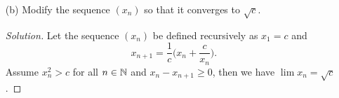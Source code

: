 \begin{enumerate}
\begin{proof}
\begin{align*}
                        &= 0. 
        \end{align*}
        Furthermore, when \( x^2 = 2 \) we get that \( x_n - x_{n+1} = 0 \). Hence, we have \( x_n - x_{n+1} \geq 0\) for all \( n \in \N \). By the Monotone Convergence Theorem, we get that \( (x_n)\) is a convergent sequence. Since \( \lim x_n = \lim x_{n+1}  \), we can show that \( \lim x_n = \sqrt{2}\). By the Algebraic Limit Theorem, we have 
        \begin{align*}
            x = \lim x_{n+1} &= \lim \Big( \frac{1}{2} \Big( x_n + \frac{2}{x_n}\Big)\Big)  \\ 
                            &= \frac{1}{2} \lim \Big( x_n + \frac{2}{x_n}\Big) \\ 
                            &= \frac{1}{2} \Big( \lim x_n + \lim  \frac{2}{x_n}  \Big) \\
                            &= \frac{1}{2} \Big(x + \frac{2}{x}\Big) \\
                            &= \frac{1}{2}x + \frac{1}{x} \\
                            &= \frac{x^2 + 2}{2x} \\
        \end{align*}
        which implies that 
        \begin{align*}
        x^2 &= 2 \\ 
        \implies x &= \sqrt{2}.
        \end{align*}
        Hence, we have \( \lim x_n = \sqrt{2} \)
    \end{proof} 
    \item[(b)] Modify the sequence \( (x_n)\) so that it converges to \( \sqrt{c}\).
        \begin{proof}[Solution]
         Let the sequence \( (x_n)\) be defined recursively as \( x_1  =c \) and 
        \[
            x_{n+1} = \frac{1}{c} \Big( x_n + \frac{c}{x_n}\Big). 
        \] 
        Assume \( x_n^2 > c \) for all \( n \in \N \) and \( x_n - x_{n+1} \geq 0\), then we have \( \lim x_n = \sqrt{c} \).
        \end{proof}
        
\end{enumerate}

